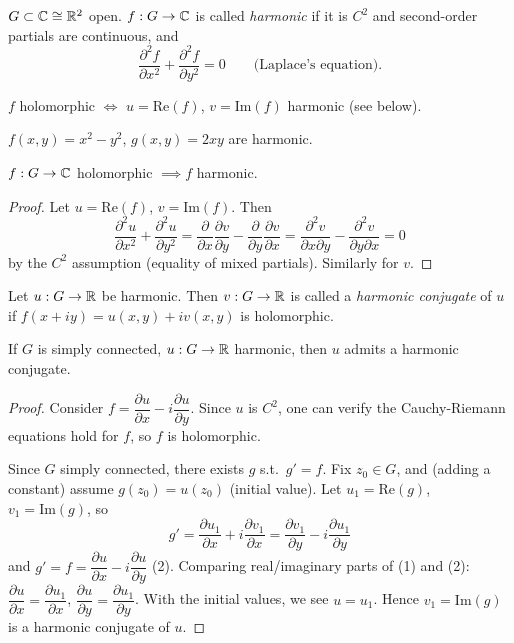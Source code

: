 \documentclass[11pt]{article}
\begin{document}
\begin{definition}
$G\subset{\mathbb{C}}\cong{\mathbb{R}}^2$ open. $f:G\to{\mathbb{C}}$ is called \emph{harmonic} if it is $C^2$ and second-order partials are continuous, and
\[
\frac{\partial^2 f}{\partial x^2} + \frac{\partial^2 f}{\partial y^2} = 0 \qquad \text{(Laplace's equation).}
\]
\end{definition}

\begin{remark}
$f$ holomorphic $\iff$ $u=\mathrm{Re}(f)$, $v=\mathrm{Im}(f)$ harmonic (see below).
\end{remark}

\begin{example}
$f(x,y)=x^2-y^2$, $g(x,y)=2xy$ are harmonic.
\end{example}

\begin{proposition}
$f: G \to {\mathbb{C}}$ holomorphic $\implies f$ harmonic.
\end{proposition}
\begin{proof}
Let $u=\mathrm{Re}(f)$, $v=\mathrm{Im}(f)$. Then
\[
\frac{\partial^2 u}{\partial x^2} + \frac{\partial^2 u}{\partial y^2} = \frac{\partial}{\partial x}\frac{\partial v}{\partial y} - \frac{\partial}{\partial y}\frac{\partial v}{\partial x} = \frac{\partial^2 v}{\partial x\partial y} - \frac{\partial^2 v}{\partial y\partial x} = 0
\]
by the $C^2$ assumption (equality of mixed partials). Similarly for $v$.
\end{proof}

\begin{definition}
Let $u:G\to{\mathbb{R}}$ be harmonic. Then $v:G\to{\mathbb{R}}$ is called a \emph{harmonic conjugate} of $u$ if $f(x+iy) = u(x,y)+iv(x,y)$ is holomorphic.
\end{definition}

\begin{theorem}
If $G$ is simply connected, $u:G\to{\mathbb{R}}$ harmonic, then $u$ admits a harmonic conjugate.
\end{theorem}

\begin{proof}
Consider $f = \dfrac{\partial u}{\partial x} - i\dfrac{\partial u}{\partial y}$. Since $u$ is $C^2$, one can verify the Cauchy-Riemann equations hold for $f$, so $f$ is holomorphic.

Since $G$ simply connected, there exists $g$ s.t.\ $g'=f$. Fix $z_0\in G$, and (adding a constant) assume $g(z_0)=u(z_0)$ (initial value). Let $u_1 = \mathrm{Re}(g)$, $v_1=\mathrm{Im}(g)$, so
\[
g' = \frac{\partial u_1}{\partial x} + i\frac{\partial v_1}{\partial x} = \frac{\partial v_1}{\partial y} - i\frac{\partial u_1}{\partial y} \tag{1}
\]
and $g' = f = \dfrac{\partial u}{\partial x} - i\dfrac{\partial u}{\partial y}$ (2). Comparing real/imaginary parts of (1) and (2): $\dfrac{\partial u}{\partial x} = \dfrac{\partial u_1}{\partial x}$, $\dfrac{\partial u}{\partial y} = \dfrac{\partial u_1}{\partial y}$. With the initial values, we see $u=u_1$. Hence $v_1 = \mathrm{Im}(g)$ is a harmonic conjugate of $u$.
\end{proof}
\end{document}
